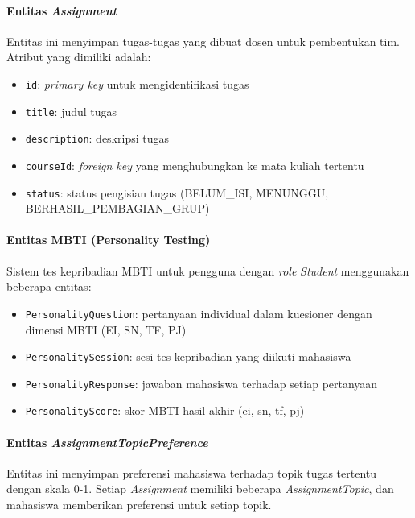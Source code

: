 \paragraph{Entitas \textit{Assignment}}
Entitas ini menyimpan tugas-tugas yang dibuat dosen untuk pembentukan tim. Atribut yang dimiliki adalah:
\begin{itemize}
	\item \texttt{id}: \textit{primary key} untuk mengidentifikasi tugas
	\item \texttt{title}: judul tugas
	\item \texttt{description}: deskripsi tugas
	\item \texttt{courseId}: \textit{foreign key} yang menghubungkan ke mata kuliah tertentu
	\item \texttt{status}: status pengisian tugas (BELUM\_ISI, MENUNGGU, BERHASIL\_PEMBAGIAN\_GRUP)
\end{itemize}

\paragraph{Entitas MBTI (Personality Testing)}
Sistem tes kepribadian MBTI untuk pengguna dengan \textit{role} \textit{Student} menggunakan beberapa entitas:
\begin{itemize}
	\item \texttt{PersonalityQuestion}: pertanyaan individual dalam kuesioner dengan dimensi MBTI (EI, SN, TF, PJ)
	\item \texttt{PersonalitySession}: sesi tes kepribadian yang diikuti mahasiswa
	\item \texttt{PersonalityResponse}: jawaban mahasiswa terhadap setiap pertanyaan
	\item \texttt{PersonalityScore}: skor MBTI hasil akhir (ei, sn, tf, pj)
\end{itemize}

\paragraph{Entitas \textit{AssignmentTopicPreference}}
Entitas ini menyimpan preferensi mahasiswa terhadap topik tugas tertentu dengan skala 0-1. Setiap \textit{Assignment} memiliki beberapa \textit{AssignmentTopic}, dan mahasiswa memberikan preferensi untuk setiap topik.

